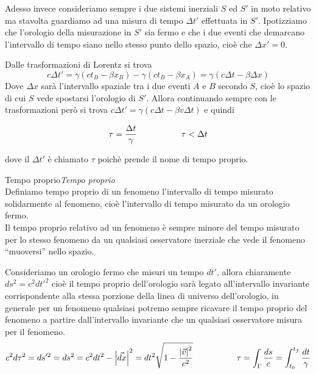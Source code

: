 \documentclass[12pt,a4paper,titlepage, twoside, openright]{book}
\newenvironment{definizione}[1][\empty]{\begin{Definizione}{
\ifx\empty#1\relax\else\mdseries\itshape#1\\\fi
}{}}{\end{Definizione}}
\numberwithin{equation}{chapter}
\begin{document}


Adesso invece consideriamo sempre i due sistemi inerziali $S$ ed $S'$ in moto relativo ma stavolta guardiamo ad una misura di tempo $\Delta t'$ effettuata in $S'$. Ipotizziamo che l'orologio della misurazione in $S'$ sia fermo e che i due eventi che demarcano l'intervallo di tempo siano nello stesso punto dello spazio, cioè che $\Delta x'=0$.

Dalle trasformazioni di Lorentz si trova
\[
c\Delta t'= \gamma (ct_B - \beta x_B) -\gamma (ct_B - \beta x_A)=\gamma (c\Delta t -\beta \Delta x)
\]
Dove $\Delta x$ sarà l'intervallo spaziale tra i due eventi $A$ e $B$ secondo $S$, cioè lo spazio di cui $S$ vede spostarsi l'orologio di $S'$. Allora continuando sempre con le trasformazioni però si trova $c\Delta t'=\gamma (c\Delta t -\beta v \Delta t)$ e quindi

\begin{equation}
\tau=\dfrac{\Delta t}{\gamma} \hspace{0.15\linewidth} \tau < \Delta t
\end{equation}

dove il $\Delta t'$ è chiamato $\tau$ poichè prende il nome di tempo proprio.

\begin{definizione}[Tempo proprio]
Definiamo tempo proprio di un fenomeno l'intervallo di tempo misurato solidarmente al fenomeno, cioè l'intervallo di tempo misurato da un orologio fermo. \\
Il tempo proprio relativo ad un fenomeno è sempre minore del tempo misurato per lo stesso fenomeno da un qualsiasi osservatore inerziale che vede il fenomeno ``muoversi'' nello spazio. 
\end{definizione}

Consideriamo un orologio fermo che misuri un tempo $dt'$, allora chiaramente $ds^2=c^2dt'^2$ cioè il tempo proprio dell'orologio sarà legato all'intervallo invariante corrispondente alla stessa porzione della linea di universo dell'orologio, in generale per un fenomeno qualsiasi potremo sempre ricavare il tempo proprio del fenomeno a partire dall'intervallo invariante che un qualsiasi osservatore misura per il fenomeno.
\begin{equation}
c^2 d\tau^2=ds'^2=ds^2=c^2dt^2- \left|\vec{dx}\right|^2 = dt^2 \sqrt{1-\dfrac{\left| \vec{v}\right|^2}{c^2}}
\hspace{0.15\linewidth}
\tau=\int_{\Gamma} \dfrac{ds}{c} = \int_{t_0}^{t_f} \dfrac{dt}{\gamma} 
\end{equation}
\end{document}
